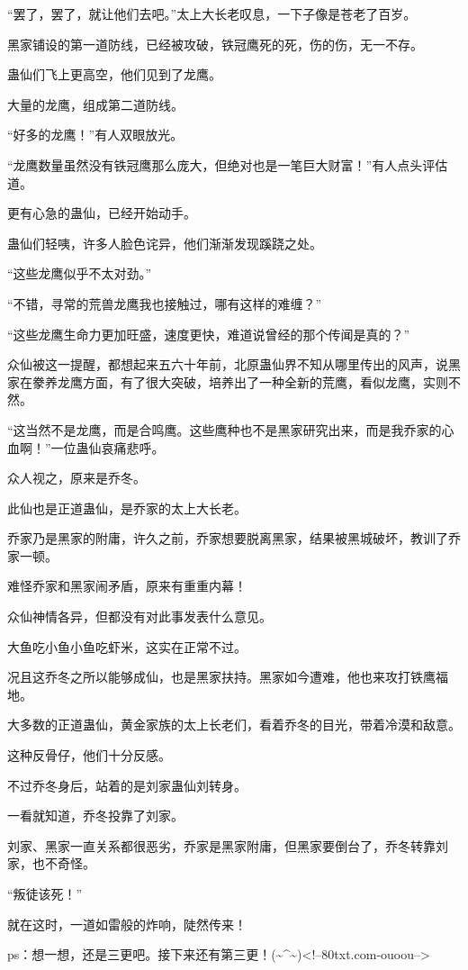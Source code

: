 \begin{this_body}
“罢了，罢了，就让他们去吧。”太上大长老叹息，一下子像是苍老了百岁。

黑家铺设的第一道防线，已经被攻破，铁冠鹰死的死，伤的伤，无一不存。

蛊仙们飞上更高空，他们见到了龙鹰。

大量的龙鹰，组成第二道防线。

“好多的龙鹰！”有人双眼放光。

“龙鹰数量虽然没有铁冠鹰那么庞大，但绝对也是一笔巨大财富！”有人点头评估道。

更有心急的蛊仙，已经开始动手。

蛊仙们轻咦，许多人脸色诧异，他们渐渐发现蹊跷之处。

“这些龙鹰似乎不太对劲。”

“不错，寻常的荒兽龙鹰我也接触过，哪有这样的难缠？”

“这些龙鹰生命力更加旺盛，速度更快，难道说曾经的那个传闻是真的？”

众仙被这一提醒，都想起来五六十年前，北原蛊仙界不知从哪里传出的风声，说黑家在豢养龙鹰方面，有了很大突破，培养出了一种全新的荒鹰，看似龙鹰，实则不然。

“这当然不是龙鹰，而是合鸣鹰。这些鹰种也不是黑家研究出来，而是我乔家的心血啊！”一位蛊仙哀痛悲呼。

众人视之，原来是乔冬。

此仙也是正道蛊仙，是乔家的太上大长老。

乔家乃是黑家的附庸，许久之前，乔家想要脱离黑家，结果被黑城破坏，教训了乔家一顿。

难怪乔家和黑家闹矛盾，原来有重重内幕！

众仙神情各异，但都没有对此事发表什么意见。

大鱼吃小鱼小鱼吃虾米，这实在正常不过。

况且这乔冬之所以能够成仙，也是黑家扶持。黑家如今遭难，他也来攻打铁鹰福地。

大多数的正道蛊仙，黄金家族的太上长老们，看着乔冬的目光，带着冷漠和敌意。

这种反骨仔，他们十分反感。

不过乔冬身后，站着的是刘家蛊仙刘转身。

一看就知道，乔冬投靠了刘家。

刘家、黑家一直关系都很恶劣，乔家是黑家附庸，但黑家要倒台了，乔冬转靠刘家，也不奇怪。

“叛徒该死！”

就在这时，一道如雷般的炸响，陡然传来！

ps：想一想，还是三更吧。接下来还有第三更！(\~{}\^{}\~{})<!--80txt.com-ouoou-->

\end{this_body}

